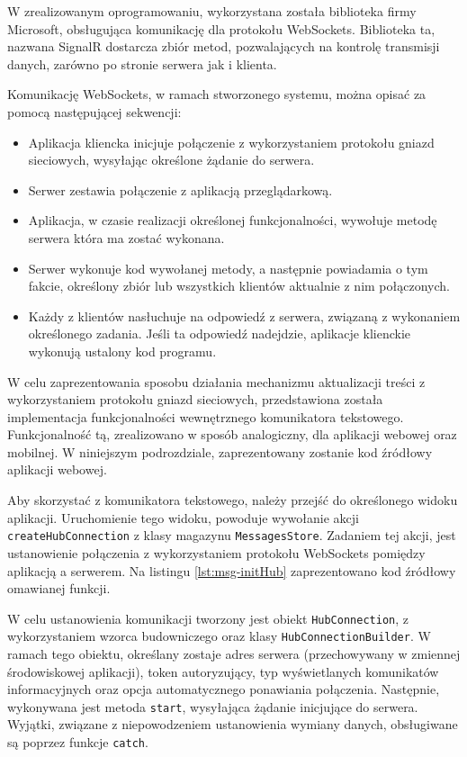 W zrealizowanym oprogramowaniu, wykorzystana została biblioteka firmy Microsoft, obsługująca komunikację dla protokołu WebSockets. Biblioteka ta, nazwana SignalR dostarcza zbiór metod, pozwalających na kontrolę transmisji danych, zarówno po stronie serwera jak i klienta.

Komunikację WebSockets, w ramach stworzonego systemu, można opisać za pomocą następującej sekwencji:
\begin{itemize}
\item Aplikacja kliencka inicjuje połączenie z wykorzystaniem protokołu gniazd sieciowych, wysyłając określone żądanie do serwera.
\item Serwer zestawia połączenie z aplikacją przeglądarkową. 
\item Aplikacja, w czasie realizacji określonej funkcjonalności, wywołuje metodę serwera która ma zostać wykonana.
\item Serwer wykonuje kod wywołanej metody, a następnie powiadamia o tym fakcie, określony zbiór lub wszystkich klientów aktualnie z nim połączonych. 
\item Każdy z klientów nasłuchuje na odpowiedź z serwera, związaną z wykonaniem określonego zadania. Jeśli ta odpowiedź nadejdzie, aplikacje klienckie wykonują ustalony kod programu.
\end{itemize}

W celu zaprezentowania sposobu działania mechanizmu aktualizacji treści z wykorzystaniem protokołu gniazd sieciowych, przedstawiona została implementacja funkcjonalności wewnętrznego komunikatora tekstowego. Funkcjonalność tą, zrealizowano w sposób analogiczny, dla aplikacji webowej oraz mobilnej. W niniejszym podrozdziale, zaprezentowany zostanie kod źródłowy aplikacji webowej.

Aby skorzystać z komunikatora tekstowego, należy przejść do określonego widoku aplikacji. Uruchomienie tego widoku, powoduje wywołanie akcji \texttt{createHubConnection} z klasy magazynu \texttt{MessagesStore}. Zadaniem tej akcji, jest ustanowienie połączenia z wykorzystaniem protokołu WebSockets pomiędzy aplikacją a serwerem. Na listingu \ref{lst:msg-initHub} zaprezentowano kod źródłowy omawianej funkcji.

W celu ustanowienia komunikacji tworzony jest obiekt \texttt{HubConnection}, z wykorzystaniem wzorca budowniczego oraz klasy \texttt{HubConnectionBuilder}. W ramach tego obiektu, określany zostaje adres serwera (przechowywany w zmiennej środowiskowej aplikacji), token autoryzujący, typ wyświetlanych komunikatów informacyjnych oraz opcja automatycznego ponawiania połączenia. Następnie, wykonywana jest metoda \texttt{start}, wysyłająca żądanie inicjujące do serwera. Wyjątki, związane z niepowodzeniem ustanowienia wymiany danych, obsługiwane są poprzez funkcje \texttt{catch}.

